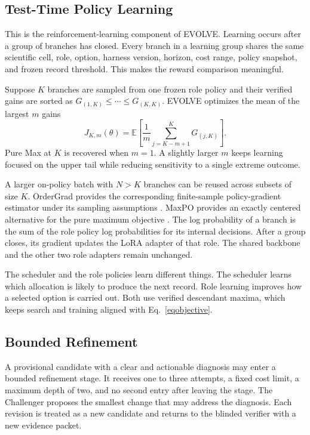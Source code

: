 \subsection{Test-Time Policy Learning}
\label{seclearning}

This is the reinforcement-learning component of EVOLVE. Learning occurs after a group of branches has closed. Every branch in a learning group shares the same scientific cell, role, option, harness version, horizon, cost range, policy snapshot, and frozen record threshold. This makes the reward comparison meaningful.

Suppose $K$ branches are sampled from one frozen role policy and their verified gains are sorted as $G_{(1,K)}\leq\cdots\leq G_{(K,K)}$. EVOLVE optimizes the mean of the largest $m$ gains
\begin{equation}
J_{K,m}(\theta)
=
\mathbb E\left[
\frac{1}{m}
\sum_{j=K-m+1}^{K}G_{(j,K)}
\right].
\label{eqtopmk}
\end{equation}
Pure Max at $K$ is recovered when $m=1$. A slightly larger $m$ keeps learning focused on the upper tail while reducing sensitivity to a single extreme outcome.

A larger on-policy batch with $N>K$ branches can be reused across subsets of size $K$. OrderGrad provides the corresponding finite-sample policy-gradient estimator under its sampling assumptions \citep{parmas2026}. MaxPO provides an exactly centered alternative for the pure maximum objective \citep{takashiro2026}. The log probability of a branch is the sum of the role policy log probabilities for its internal decisions. After a group closes, its gradient updates the LoRA adapter of that role. The shared backbone and the other two role adapters remain unchanged.

The scheduler and the role policies learn different things. The scheduler learns which allocation is likely to produce the next record. Role learning improves how a selected option is carried out. Both use verified descendant maxima, which keeps search and training aligned with Eq.~\eqref{eqobjective}.

\subsection{Bounded Refinement}
\label{secrefinement}

A provisional candidate with a clear and actionable diagnosis may enter a bounded refinement stage. It receives one to three attempts, a fixed cost limit, a maximum depth of two, and no second entry after leaving the stage. The Challenger proposes the smallest change that may address the diagnosis. Each revision is treated as a new candidate and returns to the blinded verifier with a new evidence packet.


